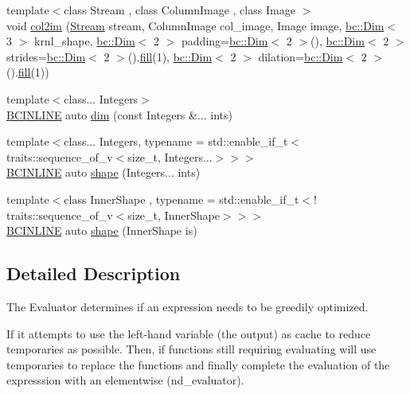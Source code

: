 \begin{DoxyCompactItemize}
\item 
{\footnotesize template$<$class Stream , class Column\+Image , class Image $>$ }\\void \hyperlink{namespacebc_a317a45582372bf3a2b0c9969f0ea877a}{col2im} (\hyperlink{classbc_1_1streams_1_1Stream}{Stream} stream, Column\+Image col\+\_\+image, Image image, \hyperlink{structbc_1_1Dim}{bc\+::\+Dim}$<$ 3 $>$ krnl\+\_\+shape, \hyperlink{structbc_1_1Dim}{bc\+::\+Dim}$<$ 2 $>$ padding=\hyperlink{structbc_1_1Dim}{bc\+::\+Dim}$<$ 2 $>$(), \hyperlink{structbc_1_1Dim}{bc\+::\+Dim}$<$ 2 $>$ strides=\hyperlink{structbc_1_1Dim}{bc\+::\+Dim}$<$ 2 $>$().\hyperlink{tensor__iteralgos_8h_afd10a40f252abd24d1faa2752becdd53}{fill}(1), \hyperlink{structbc_1_1Dim}{bc\+::\+Dim}$<$ 2 $>$ dilation=\hyperlink{structbc_1_1Dim}{bc\+::\+Dim}$<$ 2 $>$().\hyperlink{tensor__iteralgos_8h_afd10a40f252abd24d1faa2752becdd53}{fill}(1))
\item 
{\footnotesize template$<$class... Integers$>$ }\\\hyperlink{common_8h_a6699e8b0449da5c0fafb878e59c1d4b1}{B\+C\+I\+N\+L\+I\+NE} auto \hyperlink{namespacebc_a28c12b5b6f9955c77a8c4b0cf047cfb6}{dim} (const Integers \&... ints)
\item 
{\footnotesize template$<$class... Integers, typename  = std\+::enable\+\_\+if\+\_\+t$<$				traits\+::sequence\+\_\+of\+\_\+v$<$size\+\_\+t, Integers...$>$$>$$>$ }\\\hyperlink{common_8h_a6699e8b0449da5c0fafb878e59c1d4b1}{B\+C\+I\+N\+L\+I\+NE} auto \hyperlink{namespacebc_a1bc6dec532973ac024c738c0fd32cca3}{shape} (Integers... ints)
\item 
{\footnotesize template$<$class Inner\+Shape , typename  = std\+::enable\+\_\+if\+\_\+t$<$!				traits\+::sequence\+\_\+of\+\_\+v$<$size\+\_\+t, Inner\+Shape$>$$>$$>$ }\\\hyperlink{common_8h_a6699e8b0449da5c0fafb878e59c1d4b1}{B\+C\+I\+N\+L\+I\+NE} auto \hyperlink{namespacebc_a7e7e6a6d521ae8636011f211c445a712}{shape} (Inner\+Shape is)
\end{DoxyCompactItemize}


\subsection{Detailed Description}
The Evaluator determines if an expression needs to be greedily optimized. 

If it attempts to use the left-\/hand variable (the output) as cache to reduce temporaries as possible. Then, if functions still requiring evaluating will use temporaries to replace the functions and finally complete the evaluation of the expresssion with an elementwise (nd\+\_\+evaluator).

